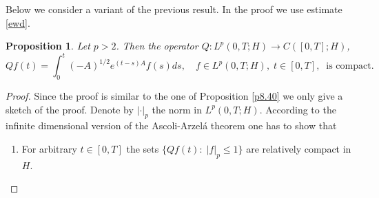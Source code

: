 \documentclass[preprint]{imsart}
\newtheorem{proposition}[theorem]{Proposition}
\begin{document}
Below we consider a variant of the previous result. In the proof we use  estimate \eqref{ewd}.  
\begin{proposition}
\label{p8.41}
 Let $p>2$.   Then the
operator ${Q} : L^{p}(0,T;H) \to C([0,T];H)  $,
\begin{displaymath}
{Q} f(t)=\int_{0}^{t} (-A)^{1/2} e^{(t-s)A}f(s)ds,\quad f \in L^{p}(0,T;H),\;t \in [0,T], \;\; \text{is compact}. 
\end{displaymath}
\end{proposition}
\begin{proof} Since the proof is similar to the one of Proposition \ref{p8.40} we only give a sketch of the proof. 
  Denote by $| \cdot |_{p}$ the norm in
$L^{p}(0,T;H)$. According to the infinite 
dimensional version of the Ascoli-Arzel\'{a}
theorem one has to show that
\begin{enumerate}
\item[(i)] For arbitrary $t \in [0,T]$ the sets
$\{ {Q}f(t): \; |f|_{p}\leq 1\}$
 are relatively
compact in $H$.  


\end{enumerate}
\end{proof}
\end{document}
